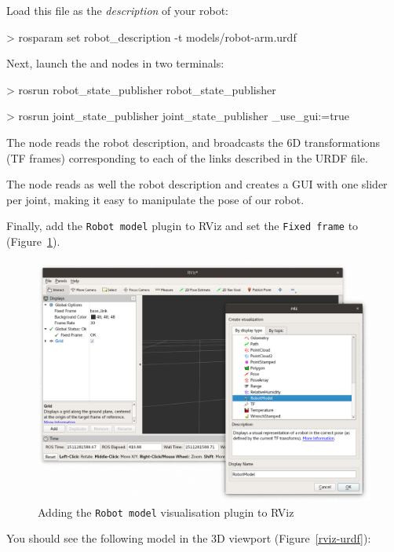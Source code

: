 \documentclass{instructions}
\begin{document}
Load this file as the \emph{description} of your robot: 

\begin{shcode}
> rosparam set robot_description -t models/robot-arm.urdf
\end{shcode}

Next, launch the  and  nodes
in two terminals:

\begin{shcode}
> rosrun robot_state_publisher robot_state_publisher
\end{shcode}

\begin{shcode}
> rosrun joint_state_publisher joint_state_publisher _use_gui:=true
\end{shcode}


The  node reads the robot description, and broadcasts the 6D transformations (TF
frames) corresponding to each of the links described in the URDF file.

The  node reads as well the robot description and
creates a GUI with one slider per joint, making it easy to manipulate the
pose of our robot.

Finally, add the \texttt{Robot model} plugin to RViz and set the \texttt{Fixed
frame} to  (Figure~\ref{rviz-robot-model}).


\begin{figure}[h!]
    \centering
    \includegraphics[width=0.52\linewidth]{rviz-plugins}
    \caption{Adding the \texttt{Robot model} visualisation plugin to RViz}
    \label{rviz-robot-model}
\end{figure}

\pagebreak
You should see the following model in the 3D viewport (Figure~\ref{rviz-urdf}):
\end{document}
